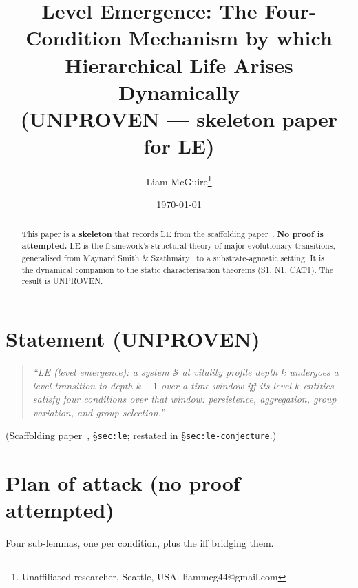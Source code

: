 \documentclass[11pt]{article}
\title{Level Emergence: The Four-Condition Mechanism by which \\
       Hierarchical Life Arises Dynamically \\
       \large (UNPROVEN --- skeleton paper for LE)}
\author{Liam McGuire\thanks{Unaffiliated researcher, Seattle, USA. liammcg44@gmail.com}}
\date{\today}
\theoremstyle{plain}
\theoremstyle{definition}
\begin{document}
\maketitle

\begin{abstract}
This paper is a \textbf{skeleton} that records LE from the
scaffolding paper~\cite{emergent_systems_2026}. \textbf{No proof is
attempted.} LE is the framework's structural theory of major
evolutionary transitions, generalised from Maynard Smith \&
Szathm\'ary~\cite{maynardsmith1995major} to a substrate-agnostic
setting. It is the dynamical companion to the static
characterisation theorems (S1, N1, CAT1). The result is UNPROVEN.
\end{abstract}

\section{Statement (UNPROVEN)}

\begin{quote}
\emph{``LE (level emergence): a system $\mathcal{S}$ at vitality
profile depth $k$ undergoes a level transition to depth $k+1$ over a
time window iff its level-$k$ entities satisfy four conditions over
that window: persistence, aggregation, group variation, and group
selection.''}
\end{quote}
\noindent (Scaffolding paper~\cite{emergent_systems_2026},
\S\texttt{sec:le}; restated in \S\texttt{sec:le-conjecture}.)

\section{Plan of attack (no proof attempted)}

Four sub-lemmas, one per condition, plus the iff bridging them.
\end{document}
